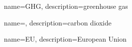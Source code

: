 \makeglossaries

{
    name=GHG,
    description={greenhouse gas}
}

{
    name=,
    description={carbon dioxide}
}

{
    name=EU,
    description={European Union}
}